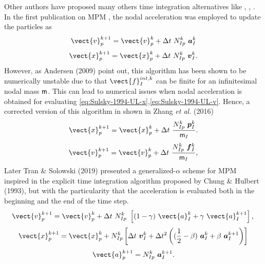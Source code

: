 Other authors have proposed many others time integration alternatives
like \cite{Guilkey2003}, \cite{Tran2019e}, \cite{Charlton2017}. In the
first publication on MPM \cite{Sulsky1994}, the nodal acceleration
was employed to update the particles as
\begin{equation}
  \label{eq:Sulsky-1994-UL-v}
  \vect{v}_p^{k+1} = \vect{v}_p^{k} + \Delta t\ N_{Ip}^{k}\ \vec{a}_{I}^{k}
\end{equation}
\begin{equation}
  \label{eq:Sulsky-1994-UL-x}
  \vect{x}_p^{k+1} = \vect{x}_p^{k} + \Delta t\ N_{Ip}^{k}\ \vec{v}_{I}^{k}.
\end{equation}
However, as Andersen (2009)\cite{thesis_Andersen_2009} point out, this algorithm has been shown to be numerically unstable due to that
$\vect{f}_I^{int,k}$ can be finite for an infinitesimal nodal mass
$\mathsf{m}$. This can lead to numerical issues when nodal acceleration
is obtained for evaluating \eqref{eq:Sulsky-1994-UL-x},\eqref{eq:Sulsky-1994-UL-v}. Hence, a
corrected version of this algorithm in shown in Zhang {\it et al.}
(2016)\cite{Zhang_book_2016}
\begin{equation}
  \label{eq:Zhang-2016-UL-x}
  \vect{x}_p^{k+1} = \vect{x}_p^{k} + \Delta t\ \frac{N_{Ip}^{k}\ \vec{p}_{I}^{k}}{\tens{m}_I}.  
\end{equation}
\begin{equation}
  \label{eq:Zhang-2016-UL-v}
  \vect{v}_p^{k+1} = \vect{v}_p^{k} + \Delta t\ \frac{N_{Ip}^{k}\ \vec{f}_{I}^{k}}{\tens{m}_I},
\end{equation}
Later Tran \& Solowski (2019)\cite{Tran2019e} presented a
generalized-$\alpha$ scheme for MPM inspired in the explicit time
integration algorithm proposed by Chung \& Hulbert
(1993)\cite{Geranlized_alpha_1993}, but with the particularity that
the acceleration is evaluated both in the beginning and the end of the
time step.
\begin{equation}
  \label{eq:Tran-2019-GA-v}
  \vect{v}_p^{k+1} = \vect{v}_p^{k} + \Delta t\  N_{Ip}^{k}\ \left[(1 - \gamma)\ \vect{a}_I^{k} +
    \gamma\ \vect{a}_I^{k+1} \right],\\
\end{equation}
\begin{equation}
\label{eq:Tran-2019-GA-x}
  \vect{x}_p^{k+1} = \vect{x}_p^{k} + N_{Ip}^{k} \left[ \Delta t\ \vec{v}_{I}^{k}+ \Delta t^2\left( (\frac{1}{2} - \beta)\
    \vec{a}_{I}^{k} + \beta\ \vec{a}_{I}^{k+1} \right) \right]
\end{equation}
\begin{equation}
  \label{eq:Tran-2019-GA-a}
  \vect{a}_p^{k+1} = N_{Ip}^{k}\ \vec{a}_{I}^{k+1}.
\end{equation}

